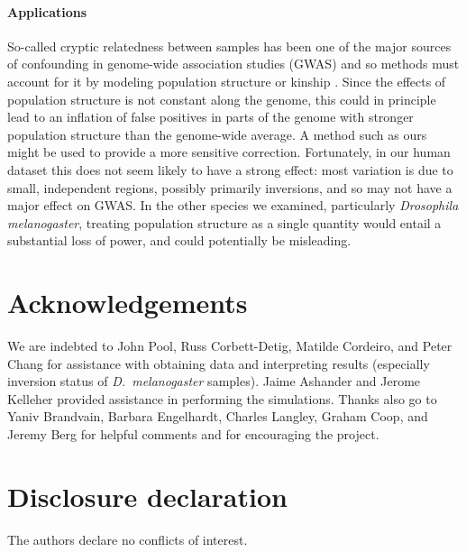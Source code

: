 \documentclass[11pt, oneside]{article}   	%
\newif\ifsubmission
\newcommand\citep{\cite}
\begin{document}
\paragraph{Applications}
So-called cryptic relatedness between samples
has been one of the major sources of confounding in genome-wide association studies (GWAS)
and so methods must account for it by modeling population structure or kinship \citep{astle2009population,yang2014advantages}.
Since the effects of population structure is not constant along the genome,
this could in principle lead to an inflation of false positives in parts of the genome
with stronger population structure than the genome-wide average.
A method such as ours might be used to provide a more sensitive correction.
Fortunately, in our human dataset this does not seem likely to have a strong effect:
most variation is due to small, independent regions, possibly primarily inversions,
and so may not have a major effect on GWAS.
In the other species we examined, particularly \textit{Drosophila melanogaster},
treating population structure as a single quantity would entail a substantial loss of power,
and could potentially be misleading.

\section*{Acknowledgements}

We are indebted to John Pool, Russ Corbett-Detig, Matilde Cordeiro, and Peter Chang 
for assistance with obtaining data and interpreting results
(especially inversion status of \textit{D.~melanogaster} samples).
Jaime Ashander and Jerome Kelleher provided assistance in performing the simulations.
Thanks also go to Yaniv Brandvain, Barbara Engelhardt, Charles Langley, Graham Coop, and Jeremy Berg for helpful comments
and for encouraging the project.

\section*{Disclosure declaration}

The authors declare no conflicts of interest.


  
\ifsubmission
    \clearpage
    \newcounter{bibend}
    \setcounter{bibend}{\value{page}}
\fi

\ifsubmission\processdelayedfloats\fi

\ifsubmission
    \clearpage
    \setcounter{page}{\thebibend}
\fi
\end{document}
